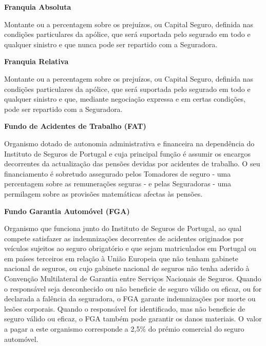\begin{description}
\item \textbf{Franquia Absoluta}

Montante ou a percentagem sobre os prejuízos, ou Capital Seguro, definida nas condições particulares da apólice, que será suportada pelo segurado em todo e qualquer sinistro e que nunca pode ser repartido com a Seguradora.
\end{description}

\begin{description}
\item \textbf{Franquia Relativa}

Montante ou a percentagem sobre os prejuízos, ou Capital Seguro, definida nas condições particulares da apólice, que será suportada pelo segurado em todo e qualquer sinistro e que, mediante negociação expressa e em certas condições, pode ser repartido com a Seguradora.
\end{description}

\begin{description}
\item \textbf{Fundo de Acidentes de Trabalho (FAT)}

Organismo dotado de autonomia administrativa e financeira na dependência do Instituto de Seguros de Portugal e cuja principal função é assumir os encargos decorrentes da actualização das pensões devidas por acidentes de trabalho. O seu financiamento é sobretudo assegurado pelos Tomadores de seguro - uma percentagem sobre as remunerações seguras - e pelas Seguradoras - uma permilagem sobre as provisões matemáticas afectas às pensões.
\end{description}

\begin{description}
\item \textbf{Fundo Garantia Automóvel (FGA)}

Organismo que funciona junto do Instituto de Seguros de Portugal, ao qual compete satisfazer as indemnizações decorrentes de acidentes originados por veículos sujeitos ao seguro obrigatório e que sejam matriculados em Portugal ou em países terceiros em relação à União Europeia que não tenham gabinete nacional de seguros, ou cujo gabinete nacional de seguros não tenha aderido à Convenção Multilateral de Garantia entre Serviços Nacionais de Seguros. Quando o responsável seja desconhecido ou não beneficie de seguro válido ou eficaz, ou for declarada a falência da seguradora, o FGA garante indemnizações por morte ou lesões corporais. Quando o responsável for identificado, mas não beneficie de seguro válido ou eficaz, o FGA também pode garantir os danos materiais. O valor a pagar a este organismo corresponde a 2,5\% do prémio comercial do seguro automóvel.
\end{description}

